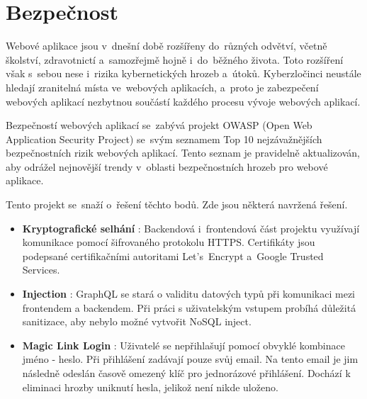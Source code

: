\chapter{Bezpečnost}
Webové aplikace jsou v~dnešní době rozšířeny do~různých odvětví, včetně školství, zdravotnictí a~samozřejmě hojně i~do~běžného života. Toto rozšíření však s~sebou nese i~rizika kybernetických hrozeb a~útoků. Kyberzločinci neustále hledají zranitelná místa ve~webových aplikacích, a~proto je zabezpečení webových aplikací nezbytnou součástí každého procesu vývoje webových aplikací. \par
Bezpečností webových aplikací se~zabývá projekt OWASP \cite{owasp}(Open Web Application Security Project) se~svým seznamem Top 10 \cite{owasp10} nejzávažnějších bezpečnostních rizik webových aplikací. Tento seznam je pravidelně aktualizován, aby odrážel nejnovější trendy v~oblasti bezpečnostních hrozeb pro webové aplikace.\par
Tento projekt se~snaží o~řešení těchto bodů. Zde jsou některá navržená řešení.\par

\begin{itemize}
    \item \textbf{Kryptografické selhání} \cite{crypto}: Backendová i~frontendová část projektu využívají komunikace pomocí šifrovaného protokolu HTTPS. Certifikáty jsou podepsané certifikačními autoritami Let's~Encrypt\cite{letsencrypt} a~Google Trusted Services.
    \item \textbf{Injection} \cite{nosqlinjection}: GraphQL se stará o validitu datových typů při komunikaci mezi frontendem a backendem. Při práci s uživatelským vstupem probíhá důležitá sanitizace, aby nebylo možné vytvořit NoSQL inject.
    \item \textbf{Magic Link Login} \cite{magiclinklogin}: Uživatelé se nepřihlašují pomocí obvyklé kombinace jméno - heslo. Při přihlášení zadávají pouze svůj email. Na tento email je jim následně odeslán časově omezený klíč pro jednorázové přihlášení. Dochází k eliminaci hrozby uniknutí hesla, jelikož není nikde uloženo.
\end{itemize}